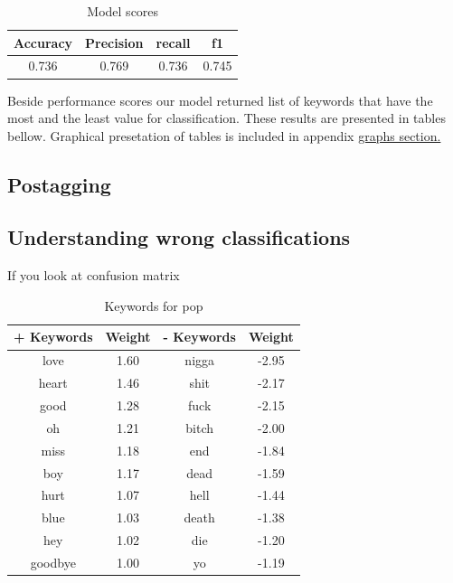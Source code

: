 \documentclass[a4paper,11pt]{article}
\begin{document}
\begin{table}[h!]
\centering
\label{baseline}
\begin{tabular}{cccc}
\hline
Accuracy & Precision & recall & f1 \\
\hline
0.736 & 0.769 & 0.736 & 0.745 \\
\end{tabular}
\label{label-model-score}
\caption{Model scores}
\end{table}

\noindent Beside performance scores our model returned list of keywords that have the most and the least value for classification. These results are presented in tables bellow. Graphical presetation of tables is included in appendix \hyperref[label-graphs]{graphs section.}


\subsection{Postagging}

\subsection{Understanding wrong classifications}

If you look at confusion matrix

\begin{table}[h!]
\centering
\label{baseline}
\begin{tabular}{cccc}
\hline
+ Keywords & Weight & - Keywords & Weight \\
\hline
love & 1.60 & nigga & -2.95 \\
heart & 1.46 & shit & -2.17 \\
good & 1.28 & fuck & -2.15 \\
oh & 1.21 & bitch & -2.00 \\
miss & 1.18 & end & -1.84 \\
boy & 1.17 & dead & -1.59 \\
hurt & 1.07 & hell & -1.44 \\
blue & 1.03 & death & -1.38 \\
hey & 1.02 & die & -1.20 \\
goodbye & 1.00 & yo & -1.19 \\
\end{tabular}
\caption{Keywords for pop}
\end{table}
\end{document}
